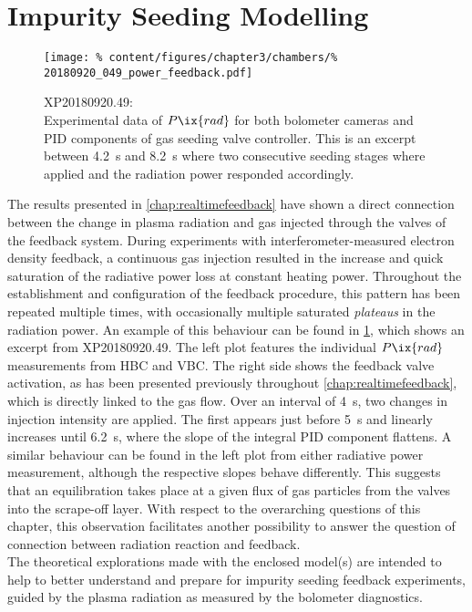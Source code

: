     \section{Impurity Seeding Modelling}\label{sec:seedmodel}%
%
        \begin{figure}[t]%
            \centering%
            \texttt{[image: \%
                content/figures/chapter3/chambers/\%
                20180920\_049\_power\_feedback.pdf]}%
            \caption{XP20180920.49:\\%
                Experimental data of $P\ix{rad}$ for both bolometer cameras and PID components of gas seeding valve controller. This is an excerpt between \SI{4.2}{\second} and \SI{8.2}{\second} where two consecutive seeding stages where applied and the radiation power responded accordingly.}\label{fig:chamber_expdata}%
        \end{figure}%
%
        The results presented in \cref{chap:realtimefeedback} have shown a direct connection between the change in plasma radiation and gas injected through the valves of the feedback system. During experiments with interferometer-measured electron density feedback, a continuous gas injection resulted in the increase and quick saturation of the radiative power loss at constant heating power. Throughout the establishment and configuration of the feedback procedure, this pattern has been repeated multiple times, with occasionally multiple saturated \textit{plateaus} in the radiation power. An example of this behaviour can be found in \cref{fig:chamber_expdata}, which shows an excerpt from XP20180920.49. The left plot features the individual $P\ix{rad}$ measurements from HBC and VBC. The right side shows the feedback valve activation, as has been presented previously throughout \cref{chap:realtimefeedback}, which is directly linked to the gas flow. Over an interval of \SI{4}{\second}, two changes in injection intensity are applied. The first appears just before \SI{5}{\second} and linearly increases until \SI{6.2}{\second}, where the slope of the integral PID component flattens. A similar behaviour can be found in the left plot from either radiative power measurement, although the respective slopes behave differently. This suggests that an equilibration takes place at a given flux of gas particles from the valves into the scrape-off layer. With respect to the overarching questions of this chapter, this observation facilitates another possibility to answer the question of connection between radiation reaction and feedback.\\%
        The theoretical explorations made with the enclosed model(s) are intended to help to better understand and prepare for impurity seeding feedback experiments, guided by the plasma radiation as measured by the bolometer diagnostics. 

